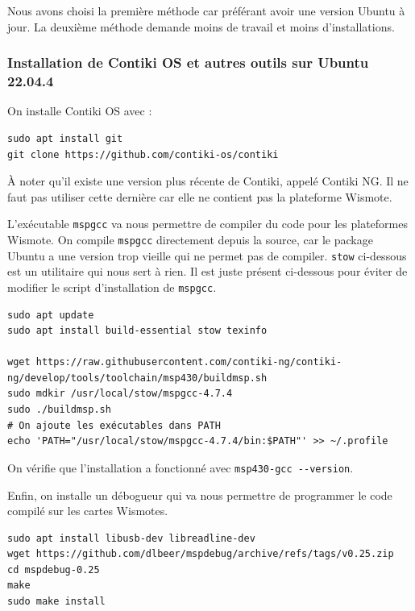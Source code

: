 \documentclass[french, a4paper, 12pt, parskip]{scrartcl}
\begin{document}
Nous avons choisi la première méthode car préférant avoir une version Ubuntu à
jour. La deuxième méthode demande moins de travail et moins d'installations.

\subsubsection{Installation de Contiki OS et autres outils sur Ubuntu 22.04.4}

On installe Contiki OS avec :

\begin{verbatim}
sudo apt install git
git clone https://github.com/contiki-os/contiki
\end{verbatim}

À noter qu'il existe une version plus récente de Contiki, appelé Contiki NG. Il
ne faut pas utiliser cette dernière car elle ne contient pas la plateforme
Wismote.

L'exécutable \verb+mspgcc+ va nous permettre de compiler du code pour les
plateformes Wismote. On compile \verb+mspgcc+ directement depuis la source, car
le package Ubuntu a une version trop vieille qui ne permet pas de compiler.
\verb+stow+ ci-dessous est un utilitaire qui nous sert à rien. Il est juste
présent ci-dessous pour éviter de modifier le script d'installation de
\verb+mspgcc+.

\begin{verbatim}
sudo apt update
sudo apt install build-essential stow texinfo

wget https://raw.githubusercontent.com/contiki-ng/contiki-ng/develop/tools/toolchain/msp430/buildmsp.sh
sudo mdkir /usr/local/stow/mspgcc-4.7.4
sudo ./buildmsp.sh
# On ajoute les exécutables dans PATH
echo 'PATH="/usr/local/stow/mspgcc-4.7.4/bin:$PATH"' >> ~/.profile
\end{verbatim}

On vérifie que l'installation a fonctionné avec \verb+msp430-gcc --version+.

Enfin, on installe un débogueur qui va nous permettre de programmer le code
compilé sur les cartes Wismotes.

\begin{verbatim}
sudo apt install libusb-dev libreadline-dev
wget https://github.com/dlbeer/mspdebug/archive/refs/tags/v0.25.zip
cd mspdebug-0.25
make
sudo make install
\end{verbatim}
\end{document}
